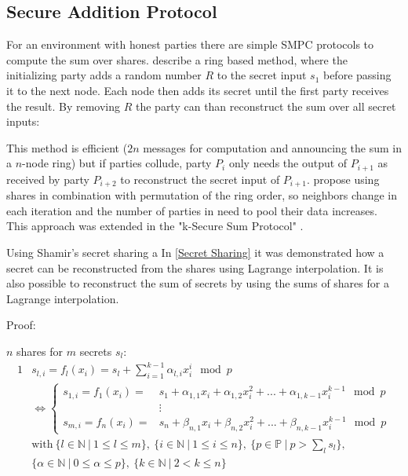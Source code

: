 		
		\subsection{Secure Addition Protocol}
		\label{Secure Addition Protocol}
		
		For an environment with honest parties there are simple \gls{SMPC} protocols to compute the sum over shares. \textcite{Clifton2002} describe a ring based method, where the initializing party adds a random number $R$ to the secret input $s_1$ before passing it to the next node. Each node then adds its secret until the first party receives the result. By removing $R$ the party can than reconstruct the sum over all secret inputs:
		
		
		This method is efficient ($2n$ messages for computation and announcing the sum in a $n$-node ring) but if parties collude, party $P_i$ only needs the output of $P_{i+1}$ as received by party $P_{i+2}$ to reconstruct the secret input of $P_{i+1}$. \textcite{Clifton2002} propose using shares in combination with permutation of the ring order, so neighbors change in each iteration and the number of parties in need to pool their data increases. This approach was extended in the "k-Secure Sum Protocol" \autocite{Sheikh2009}.
		
		Using Shamir's secret sharing a 		
		In \ref{Secret Sharing} it was demonstrated how a secret can be reconstructed from the shares using Lagrange interpolation. It is also possible to reconstruct the sum of secrets by using the sums of shares for a Lagrange interpolation.
		
		Proof:
		
		$n$ shares for $m$ secrets $s_l$:
		\begin{alignat}{1}
			&s_{l,i} = f_l(x_i) = s_l + \sum_{i=1}^{k-1} \alpha_{l,i} x_i^i \mod p \\
			& \Leftrightarrow \begin{cases}
				s_{1,i} = f_1(x_i) = & s_1 + \alpha_{1,1} x_i + \alpha_{1,2} x_i^2 + ... + \alpha_{1,k-1}x_i^{k-1} \mod p \\
				&\vdots \\
				s_{m,i} = f_n(x_i) = & s_n + \beta_{n,1} x_i + \beta_{n,2} x_i^2 + ... + \beta_{n,k-1}x_i^{k-1} \mod p
			  \end{cases} \nonumber \\
			& \text{with} \ \{l \in \mathbb{N} \ | \ 1 \leq l \leq m \},
			\ \{i \in \mathbb{N} \ | \ 1 \leq i \leq n \},
			\ \{ p \in \mathbb{P} \ | \ p > \sum_l s_l \}, \nonumber \\
			&\{ \alpha \in \mathbb{N} \ | \ 0 \leq \alpha \leq p \},
			\ \{k \in \mathbb{N} \ | \ 2 < k \leq n \} \nonumber
		\end{alignat}
		
